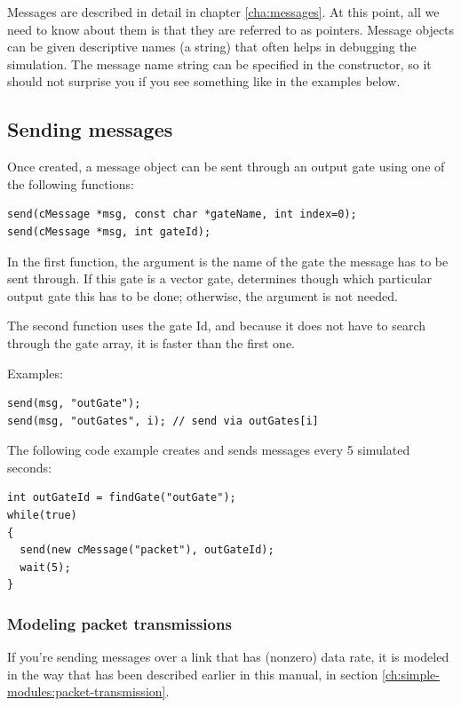 Messages are described in detail in chapter \ref{cha:messages}.
At this point, all we need to know about them is that they are
referred to as  pointers. Message objects
can be given descriptive names (a  string)
that often helps in debugging the simulation. The message
name string can be specified in the constructor, so it
should not surprise you if you see something like
 in the examples below.



\subsection{Sending messages}

Once created, a message object can be sent through an
output gate using one of the following functions:

\begin{verbatim}
send(cMessage *msg, const char *gateName, int index=0);
send(cMessage *msg, int gateId);
\end{verbatim}

In the first function, the argument  is the name of
the gate the message has to be sent through. If this gate is
a vector gate,  determines though which particular output
gate this has to be done; otherwise, the  argument is not
needed.

The second function uses the gate Id, and because it does
not have to search through the gate array, it is faster than
the first one.

Examples:

\begin{verbatim}
send(msg, "outGate");
send(msg, "outGates", i); // send via outGates[i]
\end{verbatim}

The following code example creates and sends messages
every 5 simulated seconds:

\begin{verbatim}
int outGateId = findGate("outGate");
while(true)
{
  send(new cMessage("packet"), outGateId);
  wait(5);
}
\end{verbatim}


\subsubsection{Modeling packet transmissions}

If you're sending messages over a link that has (nonzero) data rate,
it is modeled in the way that has been described earlier in this
manual, in section \ref{ch:simple-modules:packet-transmission}.

